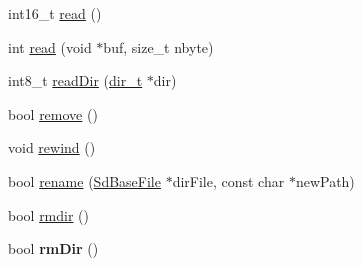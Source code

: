\begin{DoxyCompactItemize}
\item 
int16\+\_\+t \hyperlink{class_sd_base_file_a145595e55db1629fa126ffa2628fe9eb}{read} ()
\item 
int \hyperlink{class_sd_base_file_aa70609890c15df7c49d65b07d1161a3f}{read} (void $\ast$buf, size\+\_\+t nbyte)
\item 
int8\+\_\+t \hyperlink{class_sd_base_file_ae5dd9c5f9764db71c90c5fcfb02b2c97}{read\+Dir} (\hyperlink{_sd_fat_structs_8h_a803db59d4e16a0c54a647afc6a7954e3}{dir\+\_\+t} $\ast$dir)
\item 
bool \hyperlink{class_sd_base_file_a6e88ee210c9bd7556477c0e7ba4de1bb}{remove} ()
\item 
void \hyperlink{class_sd_base_file_a7a5369b40eb15ad26c2e4af5d069c52c}{rewind} ()
\item 
bool \hyperlink{class_sd_base_file_ad6e9f07c62add23dfe0338bdd0bf2d40}{rename} (\hyperlink{class_sd_base_file}{Sd\+Base\+File} $\ast$dir\+File, const char $\ast$new\+Path)
\item 
bool \hyperlink{class_sd_base_file_a7268834187e8216605963f8ae3cf1e6e}{rmdir} ()
\item 
bool {\bfseries rm\+Dir} ()\hypertarget{class_sd_base_file_a3be9577a78d8aeee50b05511869cd8c6}{}\label{class_sd_base_file_a3be9577a78d8aeee50b05511869cd8c6}


\end{DoxyCompactItemize}
